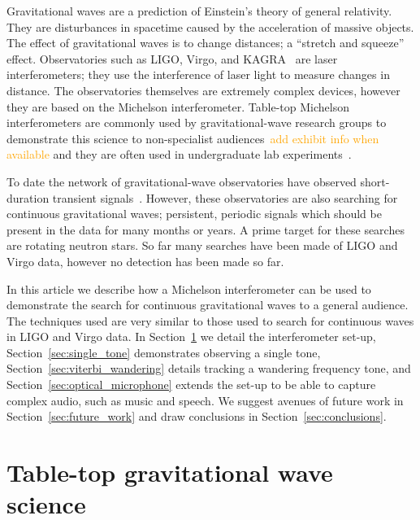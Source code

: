 \documentclass[prb,preprint]{revtex4-1}
\newcommand{\han}{\textcolor{orange}}
\begin{document}
Gravitational waves are a prediction of Einstein's theory of general relativity. 
They are disturbances in spacetime caused by the acceleration of massive objects. 
The effect of gravitational waves is to change distances; a ``stretch and squeeze'' effect. 
Observatories such as LIGO, Virgo, and KAGRA~\cite{KAGRA:2013} are laser interferometers; they use the interference of laser light to measure changes in distance. 
The observatories themselves are extremely complex devices, however they are based on the Michelson interferometer. 
Table-top Michelson interferometers are commonly used by gravitational-wave research groups to demonstrate this science to non-specialist audiences~\cite{ThorLabsIFO,NikhefIFO}\han{add exhibit info when available} and they are often used in undergraduate lab experiments~\cite{UgoliniEtAl:2019}. 


To date the network of gravitational-wave observatories have observed short-duration transient signals~\cite{GWTC-1:2018,GWOSC:online}. 
However, these observatories are also searching for continuous gravitational waves; persistent, periodic signals which should be present in the data for many months or years. 
A prime target for these searches are rotating neutron stars. 
So far many searches have been made of LIGO and Virgo data, however no detection has been made so far.


In this article we describe how a Michelson interferometer can be used to demonstrate the search for continuous gravitational waves to a general audience. 
The techniques used are very similar to those used to search for continuous waves in LIGO and Virgo data.
In Section~\ref{sec:ifo} we detail the interferometer set-up, Section~\ref{sec:single_tone} demonstrates observing a single tone, Section~\ref{sec:viterbi_wandering} details tracking a wandering frequency tone, and Section~\ref{sec:optical_microphone} extends the set-up to be able to capture complex audio, such as music and speech. We suggest avenues of future work in Section~\ref{sec:future_work} and draw conclusions in Section~\ref{sec:conclusions}.


\section{Table-top gravitational wave science}
\label{sec:ifo}
\end{document}
